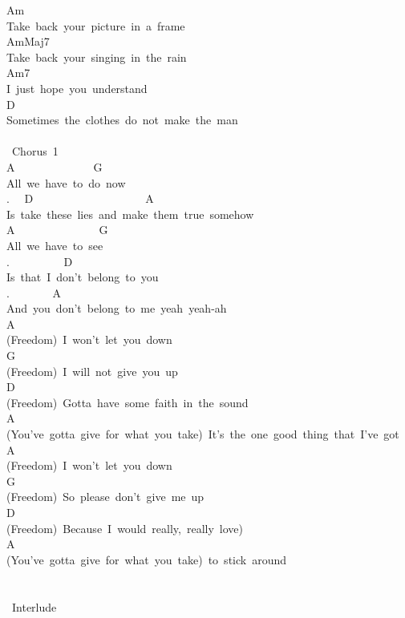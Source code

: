 {Am\\
Take\ back\ your\ picture\ in\ a\ frame\\
AmMaj7\\
Take\ back\ your\ singing\ in\ the\ rain\\
Am7\\
I\ just\ hope\ you\ understand\\
D\\
Sometimes\ the\ clothes\ do\ not\ make\ the\ man\\
\\
\lbrack\ Chorus\ 1\rbrack\\
A\ \ \ \ \ \ \ \ \ \ \ \ \ \ G\\
All\ we\ have\ to\ do\ now\\
. \ \ D\ \ \ \ \ \ \ \ \ \ \ \ \ \ \ \ \ \ \ \ A\\
Is\ take\ these\ lies\ and\ make\ them\ true\ somehow\\
A\ \ \ \ \ \ \ \ \ \ \ \ \ \ \ G\\
All\ we\ have\ to\ see\\
. \ \ \ \ \ \ \ \ \ D\ \ \ \ \ \ \ \ \ \ \\
Is\ that\ I\ don't\ belong\ to\ you\\
. \ \ \ \ \ \ \ A\\
And\ you\ don't\ belong\ to\ me\ yeah\ yeah-ah\\
A\\
(Freedom)\ I\ won't\ let\ you\ down\\
G\\
(Freedom)\ I\ will\ not\ give\ you\ up\\
D\\
(Freedom)\ Gotta\ have\ some\ faith\ in\ the\ sound\\
A\\
(You've\ gotta\ give\ for\ what\ you\ take)\ It's\ the\ one\ good\ thing\ that\ I've\ got\\
A\\
(Freedom)\ I\ won't\ let\ you\ down\\
G\\
(Freedom)\ So\ please\ don't\ give\ me\ up\\
D\\
(Freedom)\ Because\ I\ would\ really,\ really\ love)\\
A\\
(You've\ gotta\ give\ for\ what\ you\ take)\ to\ stick\ around\\
\\
\\
\lbrack\ Interlude\rbrack\\
}
